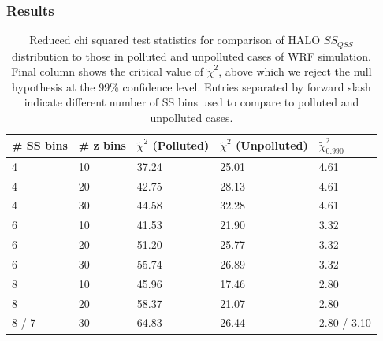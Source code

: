 \documentclass{article}
\begin{document}
\subsubsection{Results}
\begin{table}[ht]
\centering
\begin{tabular}{@{}lllll@{}}
\toprule
\textbf{\# SS bins} & \textbf{\# z bins} & \textbf{$\tilde\chi^2$ (Polluted)} & \textbf{$\tilde\chi^2$ (Unpolluted)} & \textbf{$\tilde\chi^2_{0.990}$} \\ \midrule
4 & 10 & 37.24 & 25.01 & 4.61 \\
4 & 20 & 42.75 & 28.13 & 4.61 \\
4 & 30 & 44.58 & 32.28 & 4.61 \\
6 & 10 & 41.53 & 21.90 & 3.32 \\
6 & 20 & 51.20 & 25.77 & 3.32 \\
6 & 30 & 55.74 & 26.89 & 3.32 \\
8 & 10 & 45.96 & 17.46 & 2.80 \\
8 & 20 & 58.37 & 21.07 & 2.80 \\
8 / 7 & 30 & 64.83 & 26.44 & 2.80 / 3.10 \\ \bottomrule
\end{tabular}
\caption{Reduced chi squared test statistics for comparison of HALO $SS_{QSS}$ distribution to those in polluted and unpolluted cases of WRF simulation. Final column shows the critical value of $\tilde\chi^2$, above which we reject the null hypothesis at the 99\% confidence level. Entries separated by forward slash indicate different number of SS bins used to compare to polluted and unpolluted cases.}
\label{halochisqtable}
\end{table}
\end{document}
